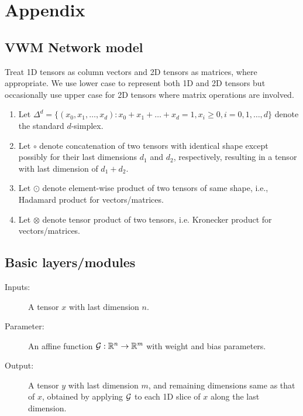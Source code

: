 \section{Appendix}



\subsection{VWM Network model}

\begin{notation}
	Treat 1D tensors as column vectors and 2D tensors as matrices, where appropriate.
	We use lower case to represent both 1D and 2D tensors but occasionally use upper case
	for 2D tensors where matrix operations are involved.
	
	\begin{enumerate}
		\item Let 
		$\Delta^d = \{ (x_0, x_1, \dots, x_d) : x_0 + x_1 + \dots + x_d = 1, x_i \ge 0, i = 0, 1, \dots, d\}$ denote the standard $d$-simplex.	
		
		\item  Let $\circ$ denote concatenation of two tensors with identical shape except possibly
		for their last dimensions $d_1$ and $d_2$, respectively,  
		resulting in a tensor with last dimension of $d_1+d_2$. 
		
		\item Let $\odot$ denote  element-wise product of two tensors of same shape,
		i.e., Hadamard product for vectors/matrices.
		
		\item Let $\otimes$ denote tensor product of two tensors, 
		i.e. Kronecker product for vectors/matrices.
	\end{enumerate}
\end{notation}	

\subsection{Basic layers/modules}


\begin{description}
	\item[Inputs:] A tensor $x$ with last dimension $n$.
	\item[Parameter:] An affine function $\mathcal{G}: \mathbb{R}^n \to \mathbb{R}^m$ with 
	weight and bias parameters.
	
	\item[Output:] A tensor $y$ with last dimension $m$, and remaining dimensions
	same as that of $x$, obtained by applying $\mathcal{G}$ to each 1D slice of $x$
	along the last dimension.
\end{description}


